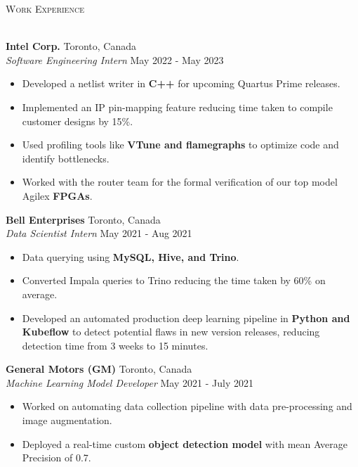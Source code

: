 \documentclass[a4paper]{article}
\newcommand{\lineunder} {
    \vspace*{-8pt} \\
    \hspace*{-18pt} \hrulefill \\
}
\newcommand{\header} [1] {
    {\hspace*{-18pt}\vspace*{6pt} \textsc{#1}}
    \vspace*{-6pt} \lineunder
}
\begin{document}
\header{Work Experience}
\vspace{1mm}

\textbf{Intel Corp.} \hfill Toronto, Canada\\
\textit{Software Engineering Intern} \hfill May 2022 - May 2023\\
\vspace{-3mm}
\begin{itemize} \itemsep 1pt
	\item Developed a netlist writer in \textbf{C++} for upcoming Quartus Prime releases.
	\item Implemented an IP pin-mapping feature reducing time taken to compile customer designs by 15\%.
	\item Used profiling tools like \textbf{VTune and flamegraphs} to optimize code and identify bottlenecks. 
	\item Worked with the router team for the formal verification of our top model Agilex \textbf{FPGAs}. 
\end{itemize}

\textbf{Bell Enterprises} \hfill Toronto, Canada\\
\textit{Data Scientist Intern} \hfill May 2021 - Aug 2021\\
\vspace{-3mm}
\begin{itemize} \itemsep 1pt
	\item Data querying using \textbf{MySQL, Hive, and Trino}. 
	\item Converted Impala queries to Trino reducing the time taken by 60\% on average.
	\item Developed an automated production deep learning pipeline in \textbf{Python and Kubeflow} to detect potential flaws in new version releases, reducing detection time from 3 weeks to 15 minutes.
\end{itemize}

\textbf{General Motors (GM)} \hfill Toronto, Canada\\
\textit{Machine Learning Model Developer} \hfill May 2021 - July 2021\\
\vspace{-3mm}
\begin{itemize} \itemsep 1pt
	\item Worked on automating data collection pipeline with data pre-processing and image augmentation.
	\item Deployed a real-time custom \textbf{object detection model} with mean Average Precision of 0.7.
\end{itemize}
\end{document}
